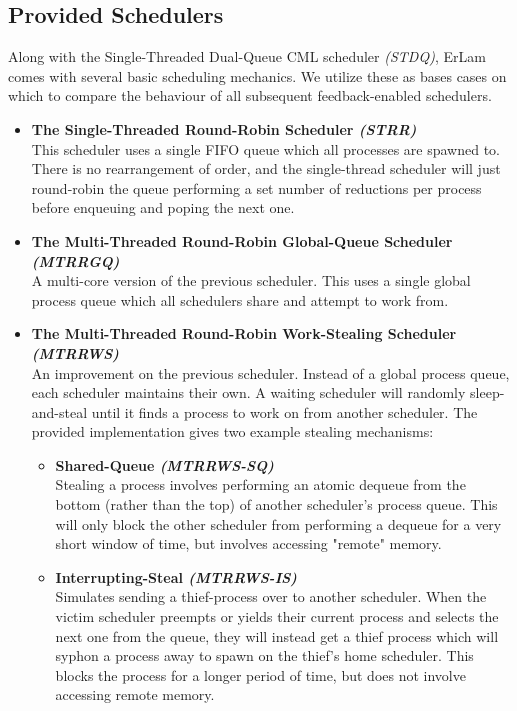\subsection{Provided Schedulers}

Along with the Single-Threaded Dual-Queue CML scheduler {\sl (STDQ)}, ErLam 
comes with several basic scheduling mechanics. We utilize these as bases cases 
on which to compare the behaviour of all subsequent feedback-enabled schedulers.

\begin{itemize}
    \item {\bf The Single-Threaded Round-Robin Scheduler {\sl (STRR)}} \\
        This scheduler uses a single FIFO queue which all processes are spawned 
        to. There is no rearrangement of order, and the single-thread scheduler 
        will just round-robin the queue performing a set number of reductions
        per process before enqueuing and poping the next one.

    \item {\bf The Multi-Threaded Round-Robin Global-Queue Scheduler {\sl (MTRRGQ)}} \\
        A multi-core version of the previous scheduler. This uses a single global
        process queue which all schedulers share and attempt to work from.

    \item {\bf The Multi-Threaded Round-Robin Work-Stealing Scheduler {\sl (MTRRWS)}} \\
        An improvement on the previous scheduler. Instead of a global process 
        queue, each scheduler maintains their own. A waiting scheduler will randomly 
        sleep-and-steal until it finds a process to work on from another scheduler. 
        The provided implementation gives two example stealing mechanisms:
        \begin{itemize}
            \item {\bf Shared-Queue {\sl (MTRRWS-SQ)}} \\
                Stealing a process involves performing an atomic dequeue from 
                the bottom (rather than the top) of another scheduler's process 
                queue. This will only block the other scheduler from performing
                a dequeue for a very short window of time, but involves 
                accessing "remote" memory.
            \item {\bf Interrupting-Steal {\sl (MTRRWS-IS)}} \\
                Simulates sending a thief-process over to another scheduler.
                When the victim scheduler preempts or yields their current process
                and selects the next one from the queue, they will instead get a
                thief process which will syphon a process away to spawn on the thief's home
                scheduler. This blocks the process for a longer period of time,
                but does not involve accessing remote memory.
        \end{itemize}
\end{itemize}

